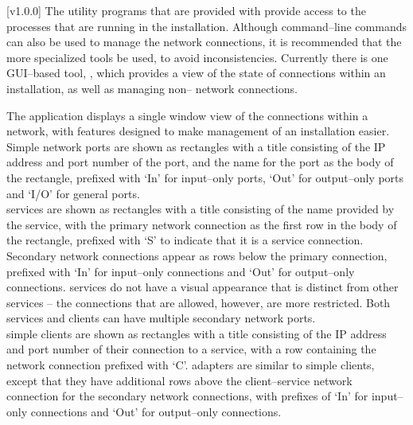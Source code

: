 [v1.0.0]
The utility programs that are provided with \mplusm{} provide access to the processes that
are running in the \mplusm{} installation.
Although command--line \yarp{} commands can also be used to manage the network
connections, it is recommended that the more specialized \mplusm{} tools be used, to avoid
inconsistencies.
Currently there is one GUI--based tool, ,
which provides a view of the state of connections within an \mplusm{} installation, as
well as managing non--\mplusm{} \yarp{} network connections.

The  application displays a single window
view of the connections within a \yarp{} network, with features designed to make
management of an \mplusm{} installation easier.
Simple \yarp{} network ports are shown as rectangles with a title consisting of the IP
address and port number of the port, and the \yarp{} name for the port as the body of the
rectangle, prefixed with `In' for input--only ports, `Out' for output--only ports and
`I/O' for general ports.\\

\mplusm{} services are shown as rectangles with a title consisting of the name provided by
the service, with the primary \yarp{} network connection as the first row in the body of
the rectangle, prefixed with `S' to indicate that it is a service connection.
Secondary \yarp{} network connections appear as rows below the primary connection,
prefixed with `In' for input--only connections and `Out' for output--only connections.
\mplusm{}  services do not have a visual appearance that is distinct from
other \mplusm{} services -- the connections that are allowed, however, are more
restricted.
Both \mplusm{} services and clients can have multiple secondary \yarp{} network ports.\\

\mplusm{} simple clients are shown as rectangles with a title consisting of the IP address
and port number of their connection to a service, with a row containing the \yarp{}
network connection prefixed with `C'.
\mplusm{} adapters are similar to \mplusm{} simple clients, except that they have
additional rows above the client--service \yarp{} network connection for the secondary
\yarp{} network connections, with prefixes of `In' for input--only connections and `Out'
for output--only connections.\\

